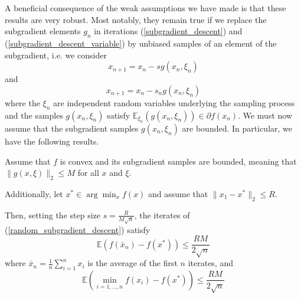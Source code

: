 A beneficial consequence of the weak assumptions we have made is that these results are very robust. 
Most notably, they remain true
if we replace the subgradient elements $g_n$ in iterations (\ref{subgradient_descent}) and (\ref{subgradient_descent_variable})
by unbiased samples of an element of the subgradient, i.e. we consider
\begin{equation}\label{random_subgradient_descent}
 x_{n+1} = x_n - sg(x_n,\xi_n)
\end{equation}
and
\begin{equation}\label{random_subgradient_descent_variable}
 x_{n+1} = x_n - s_ng(x_n,\xi_n)
\end{equation}
where the $\xi_n$ are independent random variables underlying the sampling process and the samples 
$g(x_n,\xi_n)$ satisfy $\mathbb{E}_{\xi_n}(g(x_n,\xi_n))\in \partial f(x_n)$. We must now assume that
the subgradient samples $g(x_n,\xi_n)$ are bounded. In particular, we have the
following results.
\begin{theorem}\label{random_subgradient_descent_thm}
 Assume that $f$ is convex and its subgradient samples are bounded, 
 meaning that $\|g(x,\xi)\|_2 \leq M$ for all $x$ and $\xi$.
 
 Additionally, let $x^*\in \arg\min_x f(x)$ and assume that $\|x_1 - x^*\|_2 \leq R$. 
 
 Then, setting the step size $s = \frac{R}{M\sqrt{n}}$,
 the iterates of (\ref{random_subgradient_descent}) satisfy
 \begin{equation}
  \mathbb{E}(f(\bar{x}_n) - f(x^*)) \leq \frac{RM}{2\sqrt{n}}
 \end{equation}
 where $\bar{x}_n = \frac{1}{n}\sum_{i = 1}^n x_i$ is the average of the first $n$ iterates, and
 \begin{equation}
  \mathbb{E}\left(\min_{i=1,...,n} f(x_i) - f(x^*)\right) \leq \frac{RM}{2\sqrt{n}}
 \end{equation}
 
\end{theorem}
